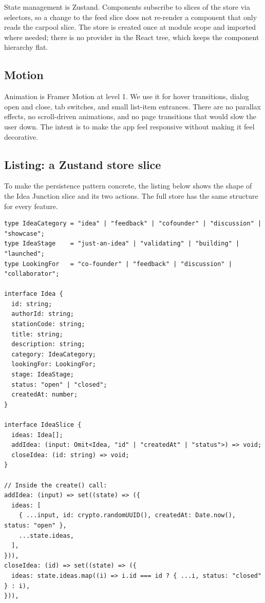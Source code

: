 \documentclass[a4paper,11pt]{article}
\begin{document}
State management is Zustand. Components subscribe to slices of the store via
selectors, so a change to the feed slice does not re-render a component that
only reads the carpool slice. The store is created once at module scope and
imported where needed; there is no provider in the React tree, which keeps
the component hierarchy flat.

\subsection{Motion}

Animation is Framer Motion at level 1. We use it for hover transitions, dialog
open and close, tab switches, and small list-item entrances. There are no
parallax effects, no scroll-driven animations, and no page transitions that
would slow the user down. The intent is to make the app feel responsive
without making it feel decorative.

\subsection{Listing: a Zustand store slice}

To make the persistence pattern concrete, the listing below shows the
shape of the Idea Junction slice and its two actions. The full store has the
same structure for every feature.

\begin{lstlisting}[caption={Idea Junction slice of the Zustand store (excerpt).},
                  label={lst:store}]
type IdeaCategory = "idea" | "feedback" | "cofounder" | "discussion" | "showcase";
type IdeaStage    = "just-an-idea" | "validating" | "building" | "launched";
type LookingFor   = "co-founder" | "feedback" | "discussion" | "collaborator";

interface Idea {
  id: string;
  authorId: string;
  stationCode: string;
  title: string;
  description: string;
  category: IdeaCategory;
  lookingFor: LookingFor;
  stage: IdeaStage;
  status: "open" | "closed";
  createdAt: number;
}

interface IdeaSlice {
  ideas: Idea[];
  addIdea: (input: Omit<Idea, "id" | "createdAt" | "status">) => void;
  closeIdea: (id: string) => void;
}

// Inside the create() call:
addIdea: (input) => set((state) => ({
  ideas: [
    { ...input, id: crypto.randomUUID(), createdAt: Date.now(), status: "open" },
    ...state.ideas,
  ],
})),
closeIdea: (id) => set((state) => ({
  ideas: state.ideas.map((i) => i.id === id ? { ...i, status: "closed" } : i),
})),
\end{lstlisting}
\end{document}
